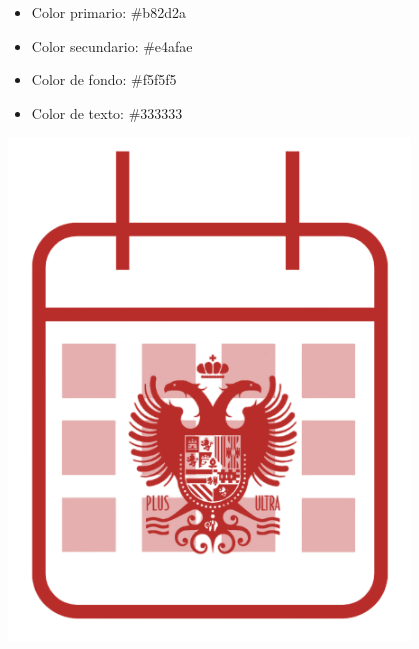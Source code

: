 \begin{center}
\begin{minipage}{0.5\textwidth}
    \begin{itemize}
        \item Color primario: \#b82d2a \colorbox[HTML]{b82d2a}{\hspace{1.5em}} \vspace{0.7em}
        \item Color secundario: \#e4afae \colorbox[HTML]{e4afae}{\hspace{1.5em}} \vspace{0.7em}
        \item Color de fondo: \#f5f5f5 \colorbox[HTML]{f5f5f5}{\hspace{1.5em}} \vspace{0.7em}
        \item Color de texto: \#333333 \colorbox[HTML]{333333}{\hspace{1.5em}}
    \end{itemize}
\end{minipage}
\hfill
\begin{minipage}{0.25\textwidth}
    \centering
    \captionsetup{justification=centering}
    \includegraphics[width=0.8\textwidth]{figures/logo.png}
    \label{fig:logo}
\end{minipage}
\end{center}

